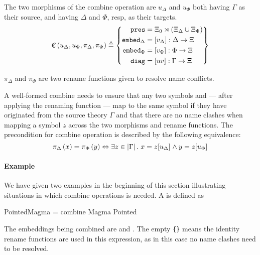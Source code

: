 The two morphisms of the combine operation are $u_{\Delta}$ and $u_{\Phi}$ both having $\Gamma$ as their source, and having $\Delta$ and $\Phi$, resp, as their targets. 
\[
\mathfrak{C}\left( u_{\Delta}, u_{\Phi}, \pi_{\Delta}, \pi_{\Phi}\right) \triangleq
\left\{\begin{aligned}
\mathtt{pres} & = \Xi_0\rtimes\left(\Xi_{\Delta} \cup \Xi_{\Phi}\right) \\
\mathtt{embed}_{\Delta} & = \left[v_{\Delta}\right] : \Delta\rightarrow\Xi\\
\mathtt{embed}_{\Phi} & = \left[v_{\Phi}\right] : \Phi\rightarrow\Xi\\
\mathtt{diag} & = \left[uv\right]:\Gamma\rightarrow\Xi\\
\end{aligned}\right\}\]
 
$\pi_{\Delta}$ and $\pi_{\Phi}$ are two rename functions given to resolve name conflicts. 

\noindent A well-formed combine needs to ensure that any two symbols  and  --- after applying the renaming function --- map to the same symbol if they have originated from the source theory $\Gamma$ and that there are no name clashes when mapping a symbol $z$ across the two morphisms and rename functions.  The precondition for combine operation is described by the following equivalence: 
\begin{equation}
\pi_{\Delta} \left( x \right) = \pi_{\Phi} \left( y \right)
\Leftrightarrow \exists z \in \left| \Gamma \right|.\ x =
z[ u_{\Delta}]_{} \wedge y = z[ u_{\Phi}]_{} 
\label{eq:combinePrecond}
\end{equation}

\paragraph{Example}
We have given two examples in the beginning of this section illustrating situations in which combine operations is needed. A  is defined as 
\begin{togcode} 
PointedMagma = combine Magma {} Pointed {} 
\end{togcode} 
The embeddings being combined are  and . The empty 
\lstinline|{}| means the identity rename functions are used in this expression, as in this case no name clashes need to be resolved. 

